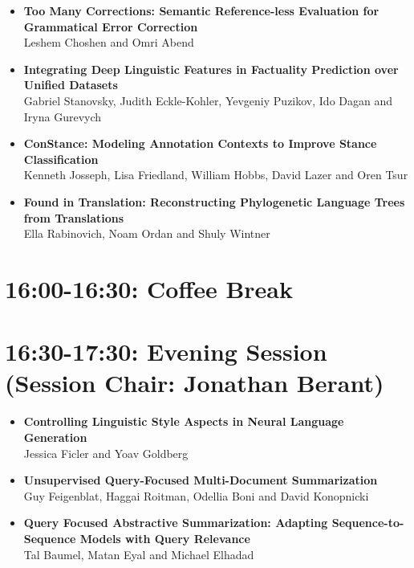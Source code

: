 \documentclass[a0,portrait]{a0poster}
\begin{document}
    \begin{itemize}
        \item
        \textbf{Too Many Corrections: Semantic Reference-less Evaluation for
        Grammatical Error Correction}\\
        Leshem Choshen and Omri Abend
        \item
        \textbf{Integrating Deep Linguistic Features in Factuality Prediction
        over Unified Datasets}\\
        Gabriel Stanovsky, Judith Eckle-Kohler, Yevgeniy Puzikov, Ido Dagan
        and Iryna Gurevych
        \item
        \textbf{ConStance: Modeling Annotation Contexts to Improve Stance
        Classification}\\
        Kenneth Josseph, Lisa Friedland, William Hobbs, David Lazer and Oren
        Tsur
        \item
        \textbf{Found in Translation: Reconstructing Phylogenetic Language
        Trees from Translations}\\
        Ella Rabinovich, Noam Ordan and Shuly Wintner
    \end{itemize}

    \section*{16:00-16:30: Coffee Break}

    \section*{16:30-17:30: Evening Session (Session Chair: Jonathan Berant)}

    \begin{itemize}
        \item
        \textbf{Controlling Linguistic Style Aspects in Neural Language
        Generation}\\
        Jessica Ficler and Yoav Goldberg
        \item
        \textbf{Unsupervised Query-Focused Multi-Document Summarization}\\
        Guy Feigenblat, Haggai Roitman, Odellia Boni and David Konopnicki
        \item
        \textbf{Query Focused Abstractive Summarization: Adapting
        Sequence-to-Sequence Models with Query Relevance}\\
        Tal Baumel, Matan Eyal and Michael Elhadad
    \end{itemize}
\end{document}
